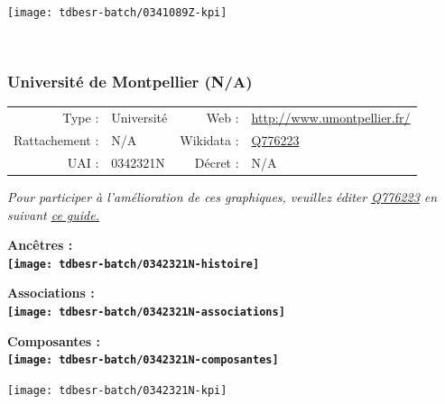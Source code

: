 \documentclass[12pt,french,]{article}
\begin{document}
\begin{center}\texttt{[image: tdbesr-batch/0341089Z-kpi]} \end{center}\checkoddpage

\ifoddpage \fi ~\newpage  

\hypertarget{universituxe9-de-montpellier-na}{%
\subsubsection{Université de Montpellier
(N/A)}\label{universituxe9-de-montpellier-na}}

\begin{tabular*}{\textwidth}{rp{5cm}rl}  
\hline  
Type : & Université & Web : &\href{http://www.umontpellier.fr/}{http://www.umontpellier.fr/} \\  
Rattachement : & N/A & Wikidata : & \href{https://www.wikidata.org/entity/Q776223}{Q776223} \\  
UAI : & 0342321N & Décret : & N/A \\  
\hline  
\end{tabular*}

\textit{\scriptsize Pour participer à l'amélioration de ces graphiques, veuillez éditer  \href{https://www.wikidata.org/entity/Q776223}{Q776223}  en suivant \href{https://github.com/cpesr/wikidataESR/blob/master/Rmd/wikidataESR.md}{ce guide.}}

\vspace{1cm}  
\begin{minipage}[b]{0.50\textwidth}\begin{center} \bf Ancêtres : \\  
\texttt{[image: tdbesr-batch/0342321N-histoire]} \end{center}\end{minipage}\begin{minipage}[b]{0.50\textwidth}\begin{center} \bf Associations : \\  
\texttt{[image: tdbesr-batch/0342321N-associations]} \end{center}\end{minipage}

\hrulefill

\begin{center} \bf Composantes : \\  
\texttt{[image: tdbesr-batch/0342321N-composantes]} \end{center}

\begin{center}\texttt{[image: tdbesr-batch/0342321N-kpi]} \end{center}\checkoddpage
\end{document}
